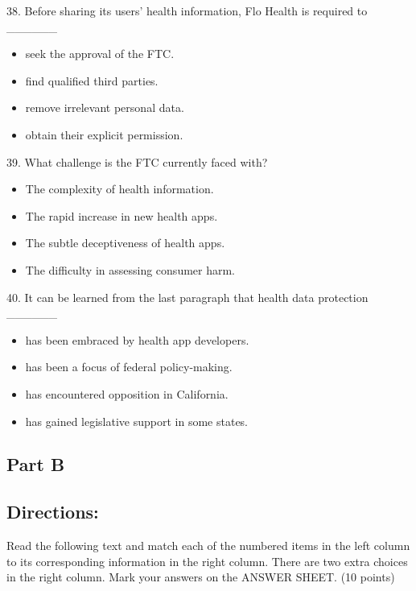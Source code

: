 \documentclass[UTF8,11pt]{ctexart}
\begin{document}
38. Before sharing its users’ health information, Flo Health is required to \_\_\_\_\_\_


\begin{itemize}[leftmargin=2em,itemsep=.2em,topsep=.4em]\item[A.] seek the approval of the FTC.
\item[B.] find qualified third parties.
\item[C.] remove irrelevant personal data.
\item[D.] obtain their explicit permission.
\end{itemize}

39. What challenge is the FTC currently faced with?


\begin{itemize}[leftmargin=2em,itemsep=.2em,topsep=.4em]\item[A.] The complexity of health information.
\item[B.] The rapid increase in new health apps.
\item[C.] The subtle deceptiveness of health apps.
\item[D.] The difficulty in assessing consumer harm.
\end{itemize}

40. It can be learned from the last paragraph that health data protection \_\_\_\_\_\_


\begin{itemize}[leftmargin=2em,itemsep=.2em,topsep=.4em]\item[A.] has been embraced by health app developers.
\item[B.] has been a focus of federal policy-making.
\item[C.] has encountered opposition in California.
\item[D.] has gained legislative support in some states.
\end{itemize}

\subsection*{\textbf{Part B}}


\subsection*{\textbf{Directions:}}


Read the following text and match each of the numbered items in the left column to its corresponding information in the right column. There are two extra choices in the right column. Mark your answers on the ANSWER SHEET. (10 points)
\end{document}
